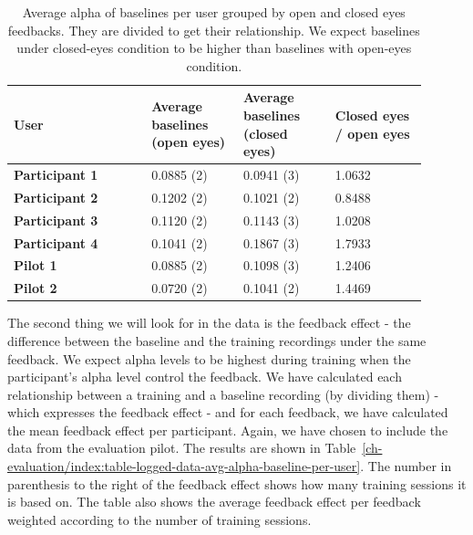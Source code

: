 \documentclass[a4paper,10pt,english,lof,lot,twoside]{puthesis}
\begin{document}
\begin{table}
\capstart
\begin{center}

\bodyspacing

\begin{tabular}{>{\raggedright\arraybackslash}p{0.30\linewidth} p{0.20\linewidth}  p{0.20\linewidth}  p{0.20\linewidth}}

\toprule
\textsf{\relax 
User
} & \textsf{\relax 
Average baselines
(open eyes)
} & \textsf{\relax 
Average baselines
(closed eyes)
} & \textsf{\relax 
Closed eyes /
open eyes
}\\
\hline\midrule

\textbf{Participant 1}
 & 
0.0885 (2)
 & 
0.0941 (3)
 & 
1.0632
\\

\textbf{Participant 2}
 & 
0.1202 (2)
 & 
0.1021 (2)
 & 
0.8488
\\

\textbf{Participant 3}
 & 
0.1120 (2)
 & 
0.1143 (3)
 & 
1.0208
\\

\textbf{Participant 4}
 & 
0.1041 (2)
 & 
0.1867 (3)
 & 
1.7933
\\

\textbf{Pilot 1}
 & 
0.0885 (2)
 & 
0.1098 (3)
 & 
1.2406
\\

\textbf{Pilot 2}
 & 
0.0720 (2)
 & 
0.1041 (2)
 & 
1.4469
\\
\hline\bottomrule

\end{tabular}
\caption[Average of all alpha per baselines per user grouped by open and closed eyes feedbacks]{Average alpha of baselines per user grouped by open and closed eyes feedbacks. They are divided to get their relationship. We expect baselines under closed-eyes condition to be higher than baselines with open-eyes condition.}\label{ch-evaluation/index:table-logged-data-avg-alpha-baseline-open-closed-eyes-per-user}
\end{center}
\end{table}

The second thing we will look for in the data is the feedback effect - the difference between the baseline and the training recordings under the same feedback. We expect alpha levels to be highest during training when the participant's alpha level control the feedback. We have calculated each relationship between a training and a baseline recording (by dividing them) - which expresses the feedback effect - and for each feedback, we have calculated the mean feedback effect per participant. Again, we have chosen to include the data from the evaluation pilot. The results are shown in Table \ref{ch-evaluation/index:table-logged-data-avg-alpha-baseline-per-user}. The number in parenthesis to the right of the feedback effect shows how many training sessions it is based on. The table also shows the average feedback effect per feedback weighted according to the number of training sessions.
\end{document}
